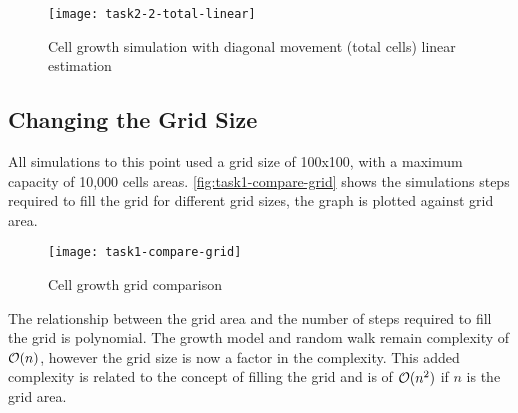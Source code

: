 \begin{figure}[ht]
    \centering
    \texttt{[image: task2-2-total-linear]}
    \caption[Cell growth simulation with diagonal movement (total cells) linear estimation]{Cell growth simulation with diagonal movement (total cells) linear estimation}
    \label{fig:task2-2-total-linear}
\end{figure}

\clearpage

\subsection{Changing the Grid Size}

All simulations to this point used a grid size of 100x100, with a maximum capacity of 10,000 cells areas.
\autoref{fig:task1-compare-grid} shows the simulations steps required to fill the grid for different grid sizes,
the graph is plotted against grid area.

\begin{figure}[ht]
    \centering
    \texttt{[image: task1-compare-grid]}
    \caption[Cell growth grid comparison]{Cell growth grid comparison}
    \label{fig:task1-compare-grid}
\end{figure}

The relationship between the grid area and the number of steps required to fill the grid is polynomial.
The growth model and random walk remain complexity of $\mathcal{O}(n)$, however the grid size is now a factor in the complexity.
This added complexity is related to the concept of filling the grid and is of $\mathcal{O}(n^2)$ if $n$ is the grid area.